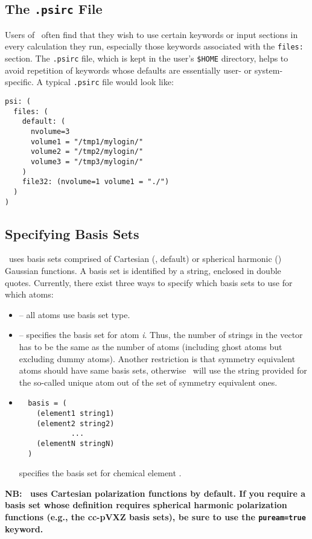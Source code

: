 \subsection{The {\tt .psirc} File} \label{psirc}

Users of \PSIthree\ often find that they wish to use certain keywords
or input sections in every calculation they run, especially those
keywords associated with the {\tt files:} section.  The {\tt .psirc}
file, which is kept in the user's {\tt \$HOME} directory, helps to
avoid repetition of keywords whose defaults are essentially user- or
system-specific.  A typical {\tt .psirc} file would look like:
\begin{verbatim}
psi: (
  files: (
    default: (
      nvolume=3
      volume1 = "/tmp1/mylogin/"
      volume2 = "/tmp2/mylogin/"
      volume3 = "/tmp3/mylogin/"
    )
    file32: (nvolume=1 volume1 = "./")
  )
)
\end{verbatim}

\subsection{Specifying Basis Sets} \label{basis-spec}

\PSIthree\ uses basis sets comprised of Cartesian (, default) or spherical harmonic ()
Gaussian functions.  A basis set is identified by a string, enclosed
in double quotes. Currently, there exist three ways to specify which
basis sets to use for which atoms:
\begin{itemize}
\item {} -- all atoms use basis set type.
\item {} -- 
specifies the basis set for atom {\em i}. Thus, the number of strings
in the  vector has to be the same as the number of
atoms (including ghost atoms but excluding dummy atoms). Another
restriction is that symmetry equivalent atoms should have same basis
sets, otherwise \PSIinput\ will use the string provided for the
so-called unique atom out of the set of symmetry equivalent ones.
\item 
\begin{verbatim}
  basis = (
    (element1 string1)
    (element2 string2)
            ...
    (elementN stringN)
  )
\end{verbatim}
 specifies the basis set for chemical element 
.
\end{itemize}
{\bf NB: \PSIthree\ uses Cartesian polarization functions by default.
  If you require a basis set whose definition requires spherical harmonic
  polarization functions (e.g., the cc-pVXZ basis sets), be sure to
  use the {\tt puream=true} keyword.}

